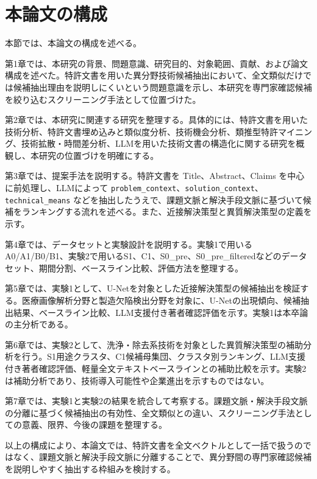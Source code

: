 \section{本論文の構成}

本節では、本論文の構成を述べる。

第1章では、本研究の背景、問題意識、研究目的、対象範囲、貢献、および論文構成を述べた。特許文書を用いた異分野技術候補抽出において、全文類似だけでは候補抽出理由を説明しにくいという問題意識を示し、本研究を専門家確認候補を絞り込むスクリーニング手法として位置づけた。

第2章では、本研究に関連する研究を整理する。具体的には、特許文書を用いた技術分析、特許文書埋め込みと類似度分析、技術機会分析、類推型特許マイニング、技術拡散・時間差分析、LLMを用いた技術文書の構造化に関する研究を概観し、本研究の位置づけを明確にする。

第3章では、提案手法を説明する。特許文書を Title、Abstract、Claims を中心に前処理し、LLMによって \texttt{problem\_context}、\texttt{solution\_context}、\texttt{technical\_means} などを抽出したうえで、課題文脈と解決手段文脈に基づいて候補をランキングする流れを述べる。また、近接解決策型と異質解決策型の定義を示す。

第4章では、データセットと実験設計を説明する。実験1で用いるA0/A1/B0/B1、実験2で用いるS1、C1、S0\_pre、S0\_pre\_filteredなどのデータセット、期間分割、ベースライン比較、評価方法を整理する。

第5章では、実験1として、U-Netを対象とした近接解決策型の候補抽出を検証する。医療画像解析分野と製造欠陥検出分野を対象に、U-Netの出現傾向、候補抽出結果、ベースライン比較、LLM支援付き著者確認評価を示す。実験1は本卒論の主分析である。

第6章では、実験2として、洗浄・除去系技術を対象とした異質解決策型の補助分析を行う。S1用途クラスタ、C1候補母集団、クラスタ別ランキング、LLM支援付き著者確認評価、軽量全文テキストベースラインとの補助比較を示す。実験2は補助分析であり、技術導入可能性や企業進出を示すものではない。

第7章では、実験1と実験2の結果を統合して考察する。課題文脈・解決手段文脈の分離に基づく候補抽出の有効性、全文類似との違い、スクリーニング手法としての意義、限界、今後の課題を整理する。

以上の構成により、本論文では、特許文書を全文ベクトルとして一括で扱うのではなく、課題文脈と解決手段文脈に分離することで、異分野間の専門家確認候補を説明しやすく抽出する枠組みを検討する。
